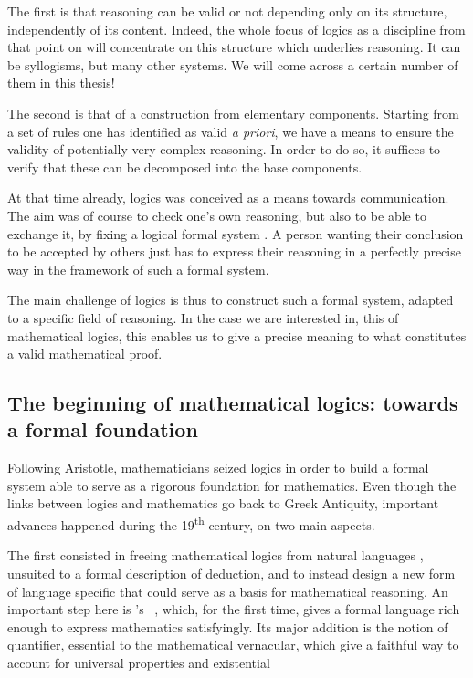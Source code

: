 The first is that reasoning can be valid or not depending only on its structure,
independently of its content. Indeed, the whole focus of logics as a discipline from that
point on will concentrate on this structure which underlies reasoning.
It can be syllogisms, but many other systems. We will come across a certain number of them
in this thesis!

The second is that of a construction from elementary components. Starting from a set of rules
one has identified as valid \textit{a priori}, we have a means to ensure the validity
of potentially very complex reasoning. In order to do so, it suffices to verify that these
can be decomposed into the base components.

At that time already, logics was conceived as a means towards communication.
The aim was of course to check one’s own reasoning, but also to be able to exchange
it, by fixing a logical formal system%
.
A person wanting their conclusion to be accepted by others just has to express their
reasoning in a perfectly precise way in the framework of such a formal system.

The main challenge of logics is thus to construct such a formal system, adapted to a specific
field of reasoning. In the case we are interested in, this of mathematical logics, this
enables us to give a precise meaning to what constitutes a valid mathematical proof.


\subsection{The beginning of mathematical logics: towards a formal foundation}

Following Aristotle, mathematicians seized logics in order to build a formal system
able to serve as a rigorous foundation for mathematics.
Even though the links between logics and mathematics go back to Greek Antiquity,
important advances happened during the 19\textsuperscript{th} century, on two main aspects.

The first consisted in freeing mathematical logics from natural languages%
,
unsuited to a formal description of deduction, and to instead design a new form of language
specific that could serve as a basis for mathematical reasoning.
An important step here is \citeauthor{Begriffsschrift}'s
~, which, for the first time,
gives a formal language rich enough to express mathematics satisfyingly. Its
major addition is the notion of quantifier, essential to the mathematical vernacular,
which give a faithful way to account for universal properties%
and existential%


